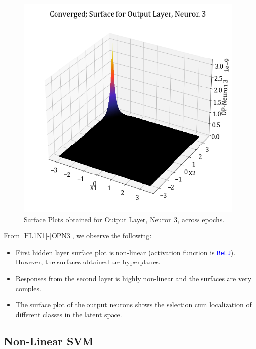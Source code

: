 \documentclass[11pt,a4paper]{article}
\newcommand{\noi}{\noindent}
\def\colortt#1{\textcolor{blue}{\texttt{#1}}}
\begin{document}
\begin{figure}[H]
    \includegraphics[scale=0.4]{images/1B_MLFFNN_conv_OP_N3.png}
    \caption{Surface Plots obtained for Output Layer, Neuron 3, across epochs.}
    \label{OPN3}
\end{figure}

\noi
From \autoref{HL1N1}-\autoref{OPN3}, we observe the following:
\begin{itemize}
    \itemsep0em 
    \item First hidden layer surface plot is non-linear (activation function is \colortt{ReLU}). However, the surfaces obtained are hyperplanes.
    \item Responses from the second layer is highly non-linear and the surfaces are very comples.
    \item The surface plot of the output neurons shows the selection cum localization of different classes in the latent space.
\end{itemize}

\subsection{Non-Linear SVM}
\end{document}
